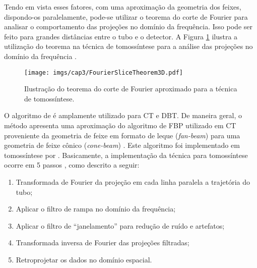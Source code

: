 Tendo em vista esses fatores, com uma aproximação da geometria dos feixes, dispondo-os paralelamente, pode-se utilizar o teorema do corte de Fourier para analisar o comportamento das projeções no domínio da frequência. Isso pode ser feito para grandes distâncias entre o tubo e o detector. A Figura \ref{fig:imgCap3FourierSliceTheorem3D} ilustra a utilização do teorema na técnica de tomossíntese para a análise das projeções no domínio da frequência \cite[p. 101-106]{mertelmeier2014filtered}.

\begin{figure}[H]
	\caption{Ilustração do teorema do corte de Fourier aproximado para a técnica de tomossíntese.}
	\begin{center}
		\texttt{[image: imgs/cap3/FourierSliceTheorem3D.pdf]}
	\end{center}
	\label{fig:imgCap3FourierSliceTheorem3D}
\end{figure} 

O algoritmo de  é amplamente utilizado para \acs{CT} e \acs{DBT}. De maneira geral, o método apresenta uma aproximação do algoritmo de \acs{FBP} utilizado em \acs{CT} proveniente da geometria de feixe em formato de leque (\textit{fan-beam}) para uma geometria de feixe cônico (\textit{cone-beam}) \cite{fessler2014fundamentals}. Este algoritmo foi implementado em tomossíntese por . Basicamente, a implementação da técnica para tomossíntese ocorre em 5 passos \cite[p. 16]{xu2014tomographic}, como descrito a seguir:   

\begin{enumerate}
	\item Transformada de Fourier da projeção em cada linha paralela a trajetória do tubo;
	\item Aplicar o filtro de rampa no domínio da frequência;
	\item Aplicar o filtro de ``janelamento'' para redução de ruído e artefatos;
	\item Transformada inversa de Fourier das projeções filtradas;
	\item Retroprojetar os dados no domínio espacial.   
\end{enumerate} 


